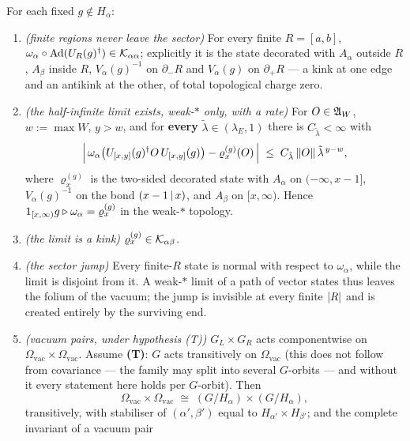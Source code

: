 \begin{theorem}
\label{thm:a2}
\statusProved\;
For each fixed $g\notin H_\alpha$:
\begin{enumerate}
\item[(a)] \emph{(finite regions never leave the sector)} For every finite
  $R=[a,b]$, $\omega_\alpha\circ\operatorname{Ad}(U_R(g)^\dagger)\in\mathcal{K}_{\alpha\alpha}$;
  explicitly it is the state decorated with $A_\alpha$ outside $R$, $A_\beta$
  inside $R$, $V_\alpha(g)^{-1}$ on $\partial_-R$ and $V_\alpha(g)$ on
  $\partial_+R$ --- a kink at one edge and an antikink at the other, of total
  topological charge zero.
\item[(b)] \emph{(the half-infinite limit exists, weak-$*$ only, with a rate)}
  For $O\in\mathfrak{A}_W$, $w:=\max W$, $y>w$, and for \textbf{every}
  $\tilde\lambda\in(\lambda_E,1)$ there is $C_{\tilde\lambda}<\infty$ with
  \begin{equation}
    \Bigl|\,\omega_\alpha\bigl(U_{[x,y]}(g)^\dagger O\,U_{[x,y]}(g)\bigr)
      -\varrho^{(g)}_x(O)\,\Bigr|
    \;\le\; C_{\tilde\lambda}\,\lVert O\rVert\,\tilde\lambda^{\,y-w},
    \label{eq:A2-rate}
  \end{equation}
  where $\varrho^{(g)}_x$ is the two-sided decorated state with $A_\alpha$ on
  $(-\infty,x-1]$, $V_\alpha(g)^{-1}$ on the bond $(x-1\,|\,x)$, and $A_\beta$
  on $[x,\infty)$.  Hence
  $1_{[x,\infty)}g\triangleright\omega_\alpha=\varrho^{(g)}_x$ in the weak-$*$ topology.
\item[(c)] \emph{(the limit is a kink)} $\varrho^{(g)}_x\in\mathcal{K}_{\alpha\beta}$.
\item[(d)] \emph{(the sector jump)} Every finite-$R$ state is normal with respect
  to $\omega_\alpha$, while the limit is disjoint from it.  A weak-$*$ limit of a
  path of vector states thus leaves the folium of the vacuum; the jump is
  invisible at every finite $\lvert R\rvert$ and is created entirely by the surviving
  end.
\item[(e)] \emph{(vacuum pairs, under hypothesis (T))} $G_L\times G_R$ acts
  componentwise on
  $\Omega_{\mathrm{vac}}\times\Omega_{\mathrm{vac}}$.  Assume \textbf{(T)}: $G$
  acts transitively on $\Omega_{\mathrm{vac}}$ (this does not follow from
  covariance --- the family may split into several $G$-orbits --- and without it
  every statement here holds per $G$-orbit).  Then
  \[
    \Omega_{\mathrm{vac}}\times\Omega_{\mathrm{vac}}
    \;\cong\;(G/H_\alpha)\times(G/H_\alpha),
  \]
  transitively, with stabiliser of $(\alpha',\beta')$ equal to
  $H_{\alpha'}\times H_{\beta'}$; and the complete invariant of a vacuum pair

\end{enumerate}
\end{theorem}
